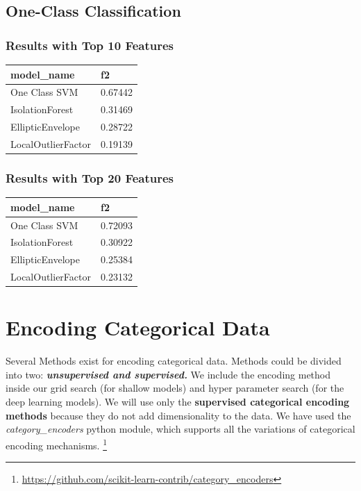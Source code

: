 \documentclass{article}
\begin{document}
\subsection{One-Class Classification}

\subsubsection*{Results with Top 10 Features}
\begin{table}[H]
\begin{tabular}{|l|l|}
\hline
\textbf{model\_name} & \textbf{f2} \\ \hline
One Class SVM        & 0.67442     \\ \hline
IsolationForest      & 0.31469     \\ \hline
EllipticEnvelope     & 0.28722     \\ \hline
LocalOutlierFactor   & 0.19139     \\ \hline
\end{tabular}
\end{table}

\subsubsection*{Results with Top 20 Features}
\begin{table}[H]
\begin{tabular}{|l|l|}
\hline
\textbf{model\_name} & \textbf{f2} \\ \hline
One Class SVM        & 0.72093     \\ \hline
IsolationForest      & 0.30922     \\ \hline
EllipticEnvelope     & 0.25384     \\ \hline
LocalOutlierFactor   & 0.23132     \\ \hline
\end{tabular}
\end{table}

\section{Encoding Categorical Data}
Several Methods exist for encoding categorical data. Methods could be divided into two: \textit{\textbf{unsupervised and supervised.}} We include the encoding method inside our grid search (for shallow models) and hyper parameter search (for the deep learning models). We will use only the \textbf{supervised categorical encoding methods} because they do not add dimensionality to the data. We have used the \textit{category\_encoders} python module, which supports all the variations of categorical encoding mechanisms. \footnote{\url{https://github.com/scikit-learn-contrib/category_encoders}}
\end{document}
